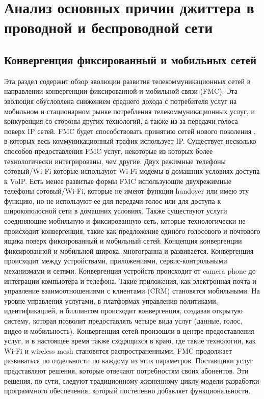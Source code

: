 \chapter{Анализ основных причин джиттера в проводной и беспроводной сети} \label{chapt1}

\section{Конвергенция фиксированный и мобильных сетей} \label{sect1_1}
Эта раздел содержит обзор эволюции развития телекоммуникационных сетей в направлении конвергенции фиксированной и мобильной связи (FMC). Эта эволюция обусловлена снижением среднего дохода с потребителя услуг на мобильном и стационарном рынке потребления телекоммуникационных услуг, и конкуренция со стороны других технологий, а также из-за передачи голоса поверх IP сетей. FMC будет способствовать принятию сетей нового поколения \cite{FMC}, в которых весь коммуникационный трафик использует IP.
Существует несколько способов предоставления FMC услуг, некоторые из которых более технологически интегрированы, чем другие. Двух режимные телефоны сотовый/Wi-Fi которые используют Wi-Fi модемы в домашних условиях доступа к VoIP. Есть менее развитые формы FMC использующие двухрежимные телефоны сотовый/Wi-Fi, которые не имеют функции handover или имею эту функцию, но не используют ее для передачи голос или для доступа к широкополосной сети в домашних условиях. Также существуют услуги соединяющие мобильную и фиксированную сеть, которые технологически не происходит конвергенция, такие как предложение единого голосового и почтового ящика поверх фиксированный и мобильный сетей.
Концепция конвергенции фиксированной и мобильной широка, многогранна и развивается. Конвергенция происходит между устройствами, приложениями, сервис-контрольными механизмами и сетями. Конвергенция устройств происходит от camera phone до интеграции компьютера и телефона. Такие приложения, как электронная почта и управление взаимоотношениями с клиентами (CRM) становятся мобильными. На уровне управления услугами, в платформах управления политиками, идентификацией, и биллингом происходит конвергенция, создавая открытую систему, которая позволит предоставлять четыре вида услуг (данные, голос, видео и мобильность). Конвергенция сетей произошли в центре предоставления услуг, и в настоящее время также сходящихся в краю, где такие технологии, как Wi-Fi и wireless mesh становятся распространенными.
FMC продолжает развиваться по отдельности по каждому из этих параметров. Поставщики услуг представляют решения, которые отвечают потребностям своих абонентов. Эти решения, по сути, следуют традиционному жизненному циклу модели разработки программного обеспечения, который постепенно добавляет функциональности.
